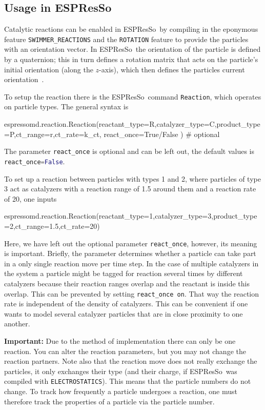 \documentclass[aip,jcp,reprint,a4paper,onecolumn,nofootinbib,amsmath,amssymb]{revtex4-1}
\newcommand\code{\lstinline}
\newcommand{\es}{\mbox{\textsf{ESPResSo}}\xspace}
\newcommand\codees{\lstinline[language=python]}
\begin{document}
\subsection{Usage in \es}

Catalytic reactions can be enabled in \es\ by compiling in the eponymous feature \code{SWIMMER_REACTIONS} and the \code{ROTATION} feature to provide the particles with an orientation vector. In \es\ the orientation of the particle is defined by a quaternion; this in turn defines a rotation matrix that acts on the particle's initial orientation (along the $z$-axis), which then defines the particles current orientation~\cite{UG,Limbach_06,Arnold_13}.

To setup the reaction there is the \es\ command \codees{Reaction}, which operates on particle types. The general syntax is
\begin{espresso}
espressomd.reaction.Reaction(reactant_type=R,catalyzer_type=C,product_type=P,ct_range=r,ct_rate=k_ct,
                                react_once=True/False ) # optional
\end{espresso}
The parameter \codees{react_once} is optional and can be left out, the default values is \codees{react_once=False}.

To set up a reaction between particles with types 1 and 2, where particles of type 3 act as catalyzers with a reaction range of 1.5 around them and a reaction rate of 20, one inputs
\begin{espresso}
espressomd.reaction.Reaction(reactant_type=1,catalyzer_type=3,product_type=2,ct_range=1.5,ct_rate=20)
\end{espresso}
Here, we have left out the optional parameter \codees{react_once}, however, its meaning is important. Briefly, the parameter determines whether a particle can take part in a only single reaction move per time step. In the case of multiple catalyzers in the system a particle might be tagged for reaction several times by different catalyzers because their reaction ranges overlap and the reactant is inside this overlap. This can be prevented by setting \code{react_once on}. That way the reaction rate is independent of the density of catalyzers. This can be convenient if one wants to model several catalyzer particles that are in close proximity to one another.

\noindent\textbf{Important:} Due to the method of implementation there can only be one reaction. You can alter the reaction parameters, but you may not change the reaction partners. Note also that the reaction move does not really exchange the particles, it only exchanges their type (and their charge, if \es\ was compiled with \code{ELECTROSTATICS}). This means that the particle numbers do not change. To track how frequently a particle undergoes a reaction, one must therefore track the properties of a particle via the particle number.
\end{document}
